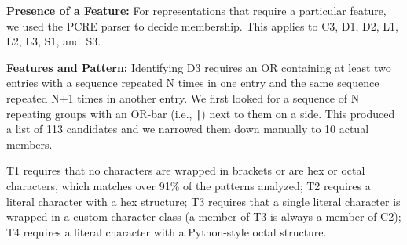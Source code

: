 \textbf{Presence of a Feature:}
For representations that require a particular feature, we used the PCRE parser to decide membership. This applies to C3, D1, D2, L1, L2, L3, S1, and~S3.

%




\textbf{Features and Pattern:}
Identifying D3 requires an OR containing at least two entries with a sequence repeated N times in one entry and the same sequence repeated N+1 times in another entry. We first looked for a sequence of N repeating groups with an OR-bar (i.e., \verb!|!) next to them on a side. This produced a list of 113 candidates and we narrowed them down manually to 10 actual members.


T1 requires that no characters are wrapped in brackets or are hex or octal characters, which matches over 91\% of the patterns analyzed;
T2 requires a literal character with a hex structure; %
T3 requires that a single literal character is wrapped in a custom character class (a member of T3 is always a member of C2);
T4 requires a literal character with a %
Python-style octal structure. %

